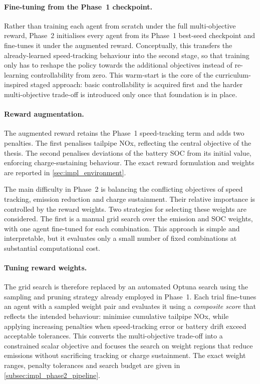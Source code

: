 \paragraph{Fine-tuning from the Phase~1 checkpoint.} Rather than training each agent from scratch under the full multi-objective reward, Phase~2 initialises every agent from its Phase~1 best-seed checkpoint and fine-tunes it under the augmented reward. Conceptually, this transfers the already-learned speed-tracking behaviour into the second stage, so that training only has to reshape the policy towards the additional objectives instead of re-learning controllability from zero. This warm-start is the core of the curriculum-inspired staged approach: basic controllability is acquired first and the harder multi-objective trade-off is introduced only once that foundation is in place.

\paragraph{Reward augmentation.}
The augmented reward retains the Phase~1 speed-tracking term and adds two penalties. The first penalises tailpipe \ac{NOx}, reflecting the central objective of the thesis. The second penalises deviations of the battery \ac{SOC} from its initial value, enforcing charge-sustaining behaviour. The exact reward formulation and weights are reported in \autoref{sec:impl_environment}.

The main difficulty in Phase~2 is balancing the conflicting objectives of speed tracking, emission reduction and charge sustainment. Their relative importance is controlled by the reward weights. Two strategies for selecting these weights are considered. The first is a manual grid search over the emission and \ac{SOC} weights, with one agent fine-tuned for each combination. This approach is simple and interpretable, but it evaluates only a small number of fixed combinations at substantial computational cost.

\paragraph{Tuning reward weights.} The grid search is therefore replaced by an automated Optuna search using the sampling and pruning strategy already employed in Phase~1. Each trial fine-tunes an agent with a sampled weight pair and evaluates it using a \emph{composite score} that reflects the intended behaviour: minimise cumulative tailpipe \ac{NOx}, while applying increasing penalties when speed-tracking error or battery drift exceed acceptable tolerances. This converts the multi-objective trade-off into a constrained scalar objective and focuses the search on weight regions that reduce emissions without sacrificing tracking or charge sustainment. The exact weight ranges, penalty tolerances and search budget are given in \autoref{subsec:impl_phase2_pipeline}.


